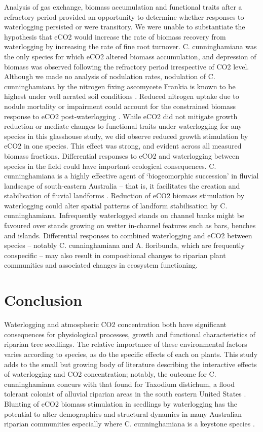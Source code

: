 \documentclass[12pt,a4paper]{memoir}
\begin{document}
Analysis of gas exchange, biomass accumulation and functional traits after a refractory period provided an opportunity to determine whether responses to waterlogging persisted or were transitory. We were unable to substantiate the hypothesis that eCO2 would increase the rate of biomass recovery from waterlogging by increasing the rate of fine root turnover. C. cunninghamiana was the only species for which eCO2 altered biomass accumulation, and depression of biomass was observed following the refractory period irrespective of CO2 level. Although we made no analysis of nodulation rates, nodulation of C. cunninghamiana by the nitrogen fixing ascomycete Frankia is known to be highest under well aerated soil conditions \cite{Dawson1989}. Reduced nitrogen uptake due to nodule mortality or impairment could account for the constrained biomass response to eCO2 post-waterlogging \cite{Reich2006}. While eCO2 did not mitigate growth reduction or mediate changes to functional traits under waterlogging for any species in this glasshouse study, we did observe reduced growth stimulation by eCO2 in one species. This effect was strong, and evident across all measured biomass fractions. Differential responses to eCO2 and waterlogging between species in the field could have important ecological consequences. C. cunninghamiana is a highly effective agent of ‘biogeomorphic succession’ in fluvial landscape of south-eastern Australia – that is, it facilitates the creation and stabilisation of fluvial landforms \cite{Erskine2009}. Reduction of eCO2 biomass stimulation by waterlogging could alter spatial patterns of landform stabilisation by C. cunninghamiana. Infrequently waterlogged stands on channel banks might be favoured over stands growing on wetter in-channel features such as bars, benches and islands. Differential responses to combined waterlogging and eCO2 between species – notably C. cunninghamiana and A. floribunda, which are frequently conspecific – may also result in compositional changes to riparian plant communities and associated changes in ecosystem functioning.

\section{Conclusion}
Waterlogging and atmospheric CO2 concentration both have significant consequences for physiological processes, growth and functional characteristics of riparian tree seedlings. The relative importance of these environmental factors varies according to species, as do the specific effects of each on plants. This study adds to the small but growing body of literature describing the interactive effects of waterlogging and CO2 concentration; notably, the outcome for C. cunninghamiana concurs with that found for Taxodium distichum, a flood tolerant colonist of alluvial riparian areas in the south eastern United States \cite{Megonigal2005}. Blunting of eCO2 biomass stimulation in seedlings by waterlogging has the potential to alter demographics and structural dynamics in many Australian riparian communities especially where C. cunninghamiana is a keystone species \cite{Woolfrey2001}.
\end{document}
